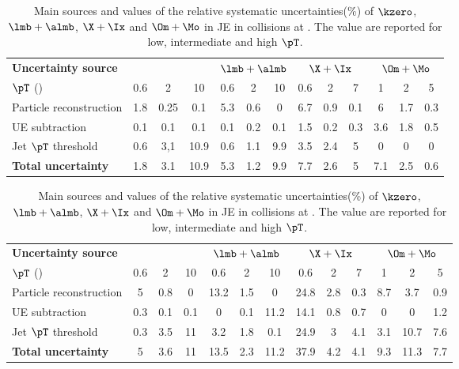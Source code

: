 \documentclass[ALICE,manyauthors]{cernphprep}
\begin{document}
\begin{table}[!ht]
	\begin{center}
		\caption{Main sources and values of the relative systematic uncertainties(\%) of $\kzero$, $\lmb + \almb$, $\X + \Ix$ and $\Om + \Mo$ in JE in \pp collisions at \thirteen.
			The value are reported for low, intermediate and high $\pT$.}
		\label{tab:ppJEUncer}
		\begin{tabularx}{\textwidth}{@{} lCCCCCCCCCCCC @{}}
			\toprule
			\textbf{Uncertainty source} & 
			& 
			& 
			&  \\
			\cmidrule(lr){2-4} \cmidrule(lr){5-7} \cmidrule(lr){8-10} \cmidrule(lr){11-13}
			$\pT$ (\GeVc) & 0.6 & 2 &10  & 0.6 & 2 & 10    & 0.6 & 2 & 7   & 1& 2 & 5 \\
			\midrule
			Particle reconstruction& 1.8& 0.25& 0.1& 5.3& 0.6& 0& 6.7& 0.9& 0.1& 6& 1.7& 0.3\\
			UE subtraction& 0.1& 0.1& 0.1& 0.1& 0.2& 0.1& 1.5& 0.2& 0.3& 3.6& 1.8& 0.5\\
			Jet $\pT$ threshold& 0.6& 3,1& 10.9& 0.6& 1.1& 9.9& 3.5& 2.4& 5& 0& 0& 0\\
			\midrule
			\textbf{Total uncertainty}& 1.8& 3.1& 10.9& 5.3& 1.2& 9.9& 7.7& 2.6& 5& 7.1& 2.5& 0.6 \\
			\bottomrule
		\end{tabularx}
	\end{center}
\end{table}

\begin{table}[!ht]
	\begin{center}
		\caption{Main sources and values of the relative systematic uncertainties(\%) of $\kzero$, $\lmb + \almb$, $\X + \Ix$ and $\Om + \Mo$ in JE in \pPb collisions at \fivenn.
			The value are reported for low, intermediate and high $\pT$.}
		\label{tab:pPbJEUncer}
		\begin{tabularx}{\textwidth}{@{} lCCCCCCCCCCCC @{}}
			\toprule
			\textbf{Uncertainty source} & 
			& 
			& 
			&  \\
			\cmidrule(lr){2-4} \cmidrule(lr){5-7} \cmidrule(lr){8-10} \cmidrule(lr){11-13}
			$\pT$ (\GeVc) & 0.6 & 2 &10  & 0.6 & 2 & 10    & 0.6 & 2 & 7   & 1& 2 & 5 \\
			\midrule
			Particle reconstruction& 5& 0.8& 0& 13.2& 1.5& 0& 24.8& 2.8& 0.3& 8.7& 3.7& 0.9\\
			UE subtraction& 0.3& 0.1& 0.1& 0& 0.1& 11.2& 14.1& 0.8& 0.7& 0& 0& 1.2\\
			Jet $\pT$ threshold& 0.3& 3.5& 11& 3.2& 1.8& 0.1& 24.9&  3& 4.1& 3.1& 10.7& 7.6\\
			\midrule
			\textbf{Total uncertainty}& 5& 3.6& 11& 13.5& 2.3& 11.2& 37.9& 4.2& 4.1& 9.3& 11.3& 7.7 \\
			\bottomrule
		\end{tabularx}
	\end{center}
\end{table}
\end{document}
